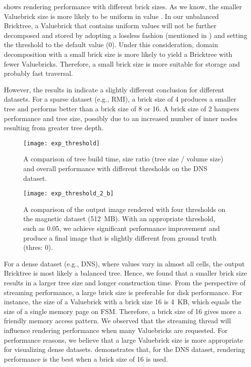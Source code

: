  shows rendering performance with different brick sizes.
As we know, the smaller Valuebrick size is more likely to be uniform in value 
\cite{fogal2013analysis}. In our unbalanced Bricktree, a Valuebrick that contains
uniform values will not be further decomposed and stored by adopting a lossless 
fashion (mentioned in ) and setting the threshold 
to the default value (0). Under this consideration, domain decomposition with a 
small brick size is more likely to yield a Bricktree with fewer Valuebricks. 
Therefore, a small brick size is more suitable for storage and probably fast traversal. 

However, the results in  indicate a slightly
different conclusion for different datasets. For a sparse dataset (e.g., RMI),
a brick size of 4 produces a smaller tree and performs better than a brick size of 8 or 16.
A brick size of 2 hampers performance and tree size, possibly due to an increased number of
inner nodes resulting from greater tree depth. 

\begin{figure}[b]
    \centering
    \texttt{[image: exp\_threshold]}
    \vspace{-2em}
	\caption{\label{fig:exp_threshold}%
	A comparison of tree build time, size ratio (tree size / volume size) and overall performance with different thresholds on the DNS dataset.}
	\vspace{-1em}
\end{figure}

\begin{figure*}[t]
    \centering
    \texttt{[image: exp\_threshold\_2\_b]}
	\caption{\label{fig:exp_threshold_2}%
	A comparison of the output image rendered with four thresholds on the magnetic dataset (512~MB).
	With an appropriate threshold, such as 0.05, we achieve significant performance improvement and produce a final image that is slightly different from ground truth (thres: 0).
	}
	\vspace{-1em}
\end{figure*}


For a dense dataset (e.g., DNS), where values vary in almost all cells,
the output Bricktree is most likely a balanced tree. Hence, we found that
a smaller brick size results in a larger tree size and longer construction time.
From the perspective of streaming performance, a large brick size is preferable 
for disk performance. For instance, the size of a Valuebrick with a
brick size 16 is 4~KB, which equals the size of a single memory page on FSM. 
Therefore, a brick size of 16 gives more a friendly memory access pattern. 
We observed that the streaming thread will influence rendering performance
when many Valuebricks are requested. For performance reasons, we believe that a 
large Valuebrick size is more appropriate for visualizing dense datasets. 
 demonstrates that, for the DNS dataset, rendering
performance is the best when a brick size of 16 is used. 

